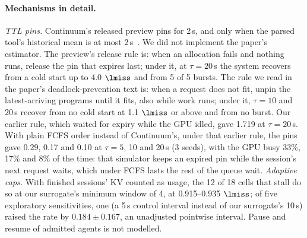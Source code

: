 \paragraph{Mechanisms in detail.} \emph{TTL pins.} Continuum's released preview pins for 2\,s, and only when the parsed tool's historical mean is at most 2\,s~\citep{li2025continuum}. We did not implement the paper's estimator. The preview's release rule is: when an allocation fails and nothing runs, release the pin that expires last; under it, at $\tau=20$\,s the system recovers from a cold start up to 4.0 $\lmiss$ and from 5 of 5 bursts. The rule we read in the paper's deadlock-prevention text is: when a request does not fit, unpin the latest-arriving programs until it fits, also while work runs; under it, $\tau=10$ and 20\,s recover from no cold start at 1.1 $\lmiss$ or above and from no burst. Our earlier rule, which waited for expiry while the GPU idled, gave 1.719 at $\tau=20$\,s. With plain FCFS order instead of Continuum's, under that earlier rule, the pins gave 0.29, 0.17 and 0.10 at $\tau=5$, 10 and 20\,s (3 seeds), with the GPU busy 33\%, 17\% and 8\% of the time: that simulator keeps an expired pin while the session's next request waits, which under FCFS lasts the rest of the queue wait. \emph{Adaptive caps.} With finished sessions' KV counted as usage, the 12 of 18 cells that stall do so at our surrogate's minimum window of 4, at 0.915--0.935 $\lmiss$; of five exploratory sensitivities, one (a 5\,s control interval instead of our surrogate's 10\,s) raised the rate by $0.184\pm0.167$, an unadjusted pointwise interval. Pause and resume of admitted agents is not modelled.

